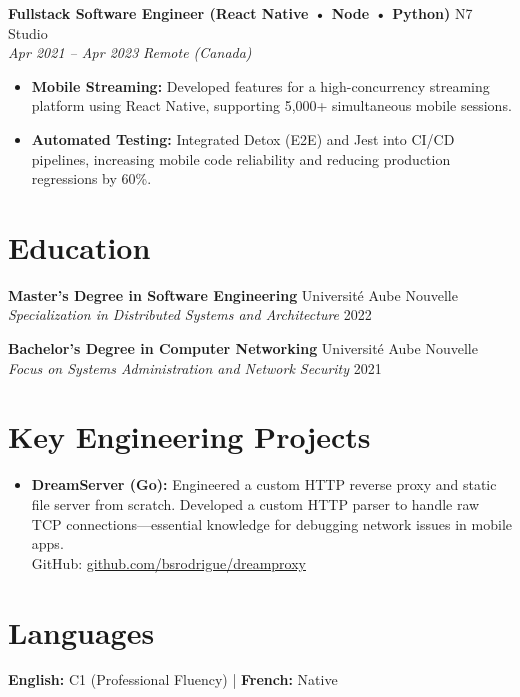 \documentclass[a4paper,10pt]{article}
\newcommand{\jobheader}[4]{%
    \textbf{#1} \hfill #2 \\
    \textit{#3} \hfill \textit{#4}
    \vspace{0.05cm}
}
\begin{document}
\jobheader{Fullstack Software Engineer (React Native • Node • Python)}{N7 Studio}{Apr 2021 -- Apr 2023}{Remote (Canada)}
\begin{itemize}[leftmargin=*,nosep]
    \item \textbf{Mobile Streaming:} Developed features for a high-concurrency streaming platform using React Native, supporting 5,000+ simultaneous mobile sessions.
    \item \textbf{Automated Testing:} Integrated Detox (E2E) and Jest into CI/CD pipelines, increasing mobile code reliability and reducing production regressions by 60\%.
\end{itemize}

\section*{Education}
\textbf{Master's Degree in Software Engineering} \hfill Université Aube Nouvelle \\
\textit{Specialization in Distributed Systems and Architecture} \hfill 2022

\textbf{Bachelor's Degree in Computer Networking} \hfill Université Aube Nouvelle \\
\textit{Focus on Systems Administration and Network Security} \hfill 2021

\section*{Key Engineering Projects}
\begin{itemize}[leftmargin=*,nosep]
    \item \textbf{DreamServer (Go):} Engineered a custom HTTP reverse proxy and static file server from scratch. Developed a custom HTTP parser to handle raw TCP connections—essential knowledge for debugging network issues in mobile apps. \\
    GitHub: \href{https://github.com/bsrodrigue/dreamproxy}{github.com/bsrodrigue/dreamproxy}
\end{itemize}

\section*{Languages}
\textbf{English:} C1 (Professional Fluency) | \textbf{French:} Native
\end{document}

